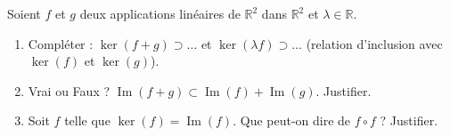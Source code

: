 \documentclass[11pt]{article}
\begin{document}
\begin{exercice}
Soient $f$ et $g$ deux applications linéaires de $\mathbb{R}^2$ dans $\mathbb{R}^2$ et $\lambda \in \mathbb{R}$.
\begin{enumerate}
    \item Compléter : $\ker(f+g) \supset \dots$ et $\ker(\lambda f) \supset \dots$ (relation d'inclusion avec $\ker(f)$ et $\ker(g)$).
    \item Vrai ou Faux ? $\operatorname{Im}(f+g) \subset \operatorname{Im}(f) + \operatorname{Im}(g)$. Justifier.
    \item Soit $f$ telle que $\ker(f) = \operatorname{Im}(f)$. Que peut-on dire de $f \circ f$ ? Justifier.
\end{enumerate}
\end{exercice}
\end{document}
